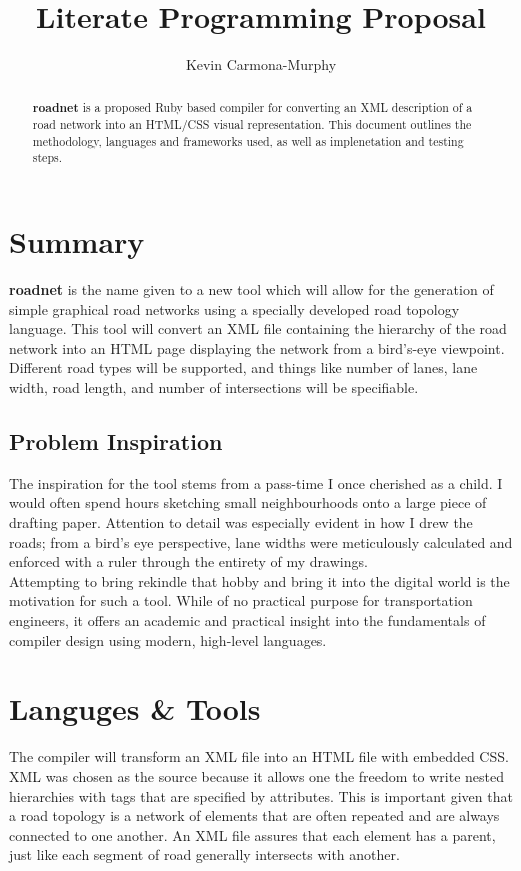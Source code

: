\documentclass{article}%
\begin{document}
\title{Literate Programming Proposal}
\author{Kevin Carmona-Murphy}

\maketitle

\begin{abstract}
\textbf{roadnet} is a proposed Ruby based compiler for converting an XML description of a road network into an HTML/CSS visual representation. This document outlines the methodology, languages and frameworks used, as well as implenetation and testing steps.
\end{abstract}

\section{Summary}
\textbf{roadnet} is the name given to a new tool which will allow for the generation of simple graphical road networks using a specially developed road topology language. This tool will convert an XML file containing the hierarchy of the road network into an HTML page displaying the network from a bird's-eye viewpoint. Different road types will be supported, and things like number of lanes, lane width, road length, and number of intersections will be specifiable.

\subsection{Problem Inspiration}
The inspiration for the tool stems from a pass-time I once cherished as a child. I would often spend hours sketching small neighbourhoods onto a large piece of drafting paper. Attention to detail was especially evident in how I drew the roads; from a bird's eye perspective, lane widths were meticulously calculated and enforced with a ruler through the entirety of my drawings.\\

Attempting to bring rekindle that hobby and bring it into the digital world is the motivation for such a tool. While of no practical purpose for transportation engineers, it offers an academic and practical insight into the fundamentals of compiler design using modern, high-level languages.

\section{Languges \& Tools}
The compiler will transform an XML file into an HTML file with embedded CSS. XML was chosen as the source because it allows one the freedom to write nested hierarchies with tags that are specified by attributes. This is important given that a road topology is a network of elements that are often repeated and are always connected to one another. An XML file assures that each element has a parent, just like each segment of road generally intersects with another.\\
\end{document}
